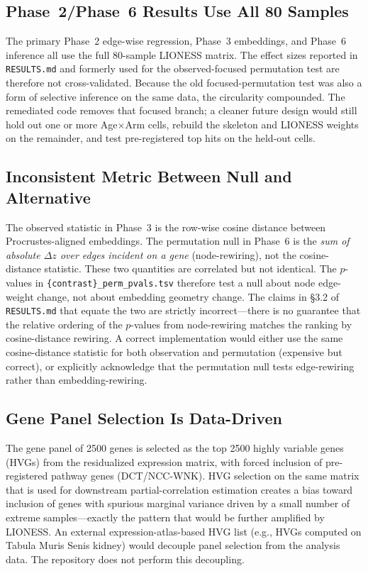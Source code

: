 \documentclass[11pt]{article}
\newcommand{\code}[1]{\texttt{#1}}
\begin{document}
\subsection{Phase~2/Phase~6 Results Use All 80 Samples}
The primary Phase~2 edge-wise regression, Phase~3 embeddings, and Phase~6 inference all use the full 80-sample LIONESS matrix. The effect sizes reported in \code{RESULTS.md} and formerly used for the observed-focused permutation test are therefore not cross-validated. Because the old focused-permutation test was also a form of selective inference on the same data, the circularity compounded. The remediated code removes that focused branch; a cleaner future design would still hold out one or more Age$\times$Arm cells, rebuild the skeleton and LIONESS weights on the remainder, and test pre-registered top hits on the held-out cells.

\subsection{Inconsistent Metric Between Null and Alternative}
The observed statistic in Phase~3 is the row-wise cosine distance between Procrustes-aligned embeddings. The permutation null in Phase~6 is the \emph{sum of absolute $\Delta z$ over edges incident on a gene} (node-rewiring), not the cosine-distance statistic. These two quantities are correlated but not identical. The $p$-values in \code{\{contrast\}\_perm\_pvals.tsv} therefore test a null about node edge-weight change, not about embedding geometry change. The claims in \S 3.2 of \code{RESULTS.md} that equate the two are strictly incorrect---there is no guarantee that the relative ordering of the $p$-values from node-rewiring matches the ranking by cosine-distance rewiring. A correct implementation would either use the same cosine-distance statistic for both observation and permutation (expensive but correct), or explicitly acknowledge that the permutation null tests edge-rewiring rather than embedding-rewiring.

\subsection{Gene Panel Selection Is Data-Driven}
The gene panel of 2500 genes is selected as the top 2500 highly variable genes (HVGs) from the residualized expression matrix, with forced inclusion of pre-registered pathway genes (DCT/NCC-WNK). HVG selection on the same matrix that is used for downstream partial-correlation estimation creates a bias toward inclusion of genes with spurious marginal variance driven by a small number of extreme samples---exactly the pattern that would be further amplified by LIONESS. An external expression-atlas-based HVG list (e.g., HVGs computed on Tabula Muris Senis kidney) would decouple panel selection from the analysis data. The repository does not perform this decoupling.
\end{document}

